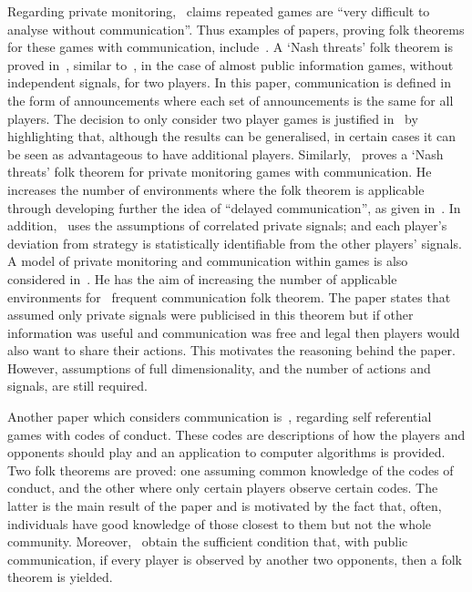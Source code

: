 Regarding private monitoring,~\cite{Obara2009} claims repeated games are ``very
difficult to analyse without communication''. Thus examples of papers, proving
folk theorems for these games with communication,
include~\cite{Fudenberg2008,Li2010,Obara2009}. A
`Nash threats' folk theorem is proved in~\cite{Fudenberg2008},
similar to~\cite{Friedman1971}, in the case of almost public information games,
without independent signals, for two players. In this paper, communication is
defined in the form of announcements where each set of announcements is the same
for all players. The decision to only consider two player games is justified
in~\cite{Fudenberg2008} by
highlighting that, although the results can be generalised, in certain cases it
can be seen as advantageous to have additional players. Similarly,~\cite{Obara2009} proves a `Nash threats' folk theorem for private monitoring games
with communication. He increases the number of environments where the folk
theorem is applicable through developing further the idea of ``delayed
communication'', as given in~\cite{Compte1998}. In addition,~\cite{Obara2009}
uses the assumptions of correlated private signals; and each player's deviation
from strategy is statistically identifiable from the other players' signals. A model of private monitoring and communication
within games is also considered in~\cite{Li2010}. He has the aim of increasing the number of applicable
environments for~\cite{Kandori1998} frequent
communication folk theorem. The paper states that~\cite{Kandori1998} assumed only private signals were publicised in this theorem
but if other information was useful and communication was free and legal then
players would also want to share their actions. This motivates the reasoning
behind the paper. However, assumptions of full dimensionality, and the
number of actions and signals, are still required. 

Another paper which considers communication is~\cite{Block2016}, regarding self
referential games with codes of conduct. These codes are descriptions of how the
players and opponents should play and an application to computer algorithms is
provided. Two folk theorems are proved: one assuming common knowledge of the
codes of conduct, and the other where only certain players observe certain
codes. The latter is the main result of the paper and is motivated by the fact
that, often, individuals have good knowledge of those closest to them but not
the whole community. Moreover,~\cite{Block2016} obtain the sufficient condition
that, with public communication, if every player is observed by another two
opponents, then a folk theorem is yielded.


